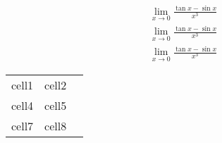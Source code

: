 \documentclass[14pt]{extarticle}
\begin{document}
\begin{gather*}
\lim_{x \to 0} \frac{\tan{x} - \sin{x}}{x^3} \\
\lim_{x \to 0} \frac{\tan{x} - \sin{x}}{x^3}\\
\lim_{x \to 0} \frac{\tan{x} - \sin{x}}{x^3}
\end{gather*}


\begin{tabular}{ c c c }
 cell1 & cell2  \\ 
 cell4 & cell5  \\  
 cell7 & cell8     
\end{tabular}
\end{document}
